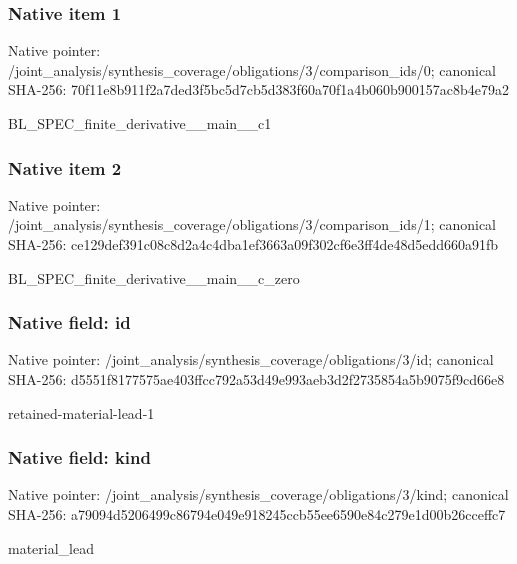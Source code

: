 \documentclass[10pt,a4paper]{article}
\begin{document}
\subsubsection{Native item 1}
Native pointer: /joint\_\allowbreak{}analysis/synthesis\_\allowbreak{}coverage/obligations/3/comparison\_\allowbreak{}ids/0; canonical SHA-256: 70f11e8b911f2a7ded3f5bc5d7cb5d383f60a70f1a4b060b900157ac8b4e79a2

\begingroup\raggedright\sloppy BL\_\allowbreak{}SPEC\_\allowbreak{}finite\_\allowbreak{}derivative\_\allowbreak{}\_\allowbreak{}main\_\allowbreak{}\_\allowbreak{}c1\par\endgroup

\subsubsection{Native item 2}
Native pointer: /joint\_\allowbreak{}analysis/synthesis\_\allowbreak{}coverage/obligations/3/comparison\_\allowbreak{}ids/1; canonical SHA-256: ce129def391c08c8d2a4c4dba1ef3663a09f302cf6e3ff4de48d5edd660a91fb

\begingroup\raggedright\sloppy BL\_\allowbreak{}SPEC\_\allowbreak{}finite\_\allowbreak{}derivative\_\allowbreak{}\_\allowbreak{}main\_\allowbreak{}\_\allowbreak{}c\_\allowbreak{}zero\par\endgroup

\subsubsection{Native field: id}
Native pointer: /joint\_\allowbreak{}analysis/synthesis\_\allowbreak{}coverage/obligations/3/id; canonical SHA-256: d5551f8177575ae403ffcc792a53d49e993aeb3d2f2735854a5b9075f9cd66e8

\begingroup\raggedright\sloppy retained-material-lead-1\par\endgroup

\subsubsection{Native field: kind}
Native pointer: /joint\_\allowbreak{}analysis/synthesis\_\allowbreak{}coverage/obligations/3/kind; canonical SHA-256: a79094d5206499c86794e049e918245ccb55ee6590e84c279e1d00b26cceffc7

\begingroup\raggedright\sloppy material\_\allowbreak{}lead\par\endgroup
\end{document}

